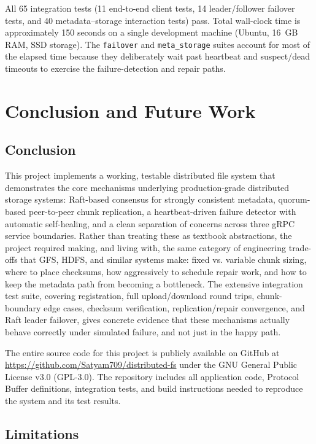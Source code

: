 \documentclass[12pt,a4paper]{report}
\begin{document}
All 65 integration tests (11 end-to-end client tests, 14 leader/follower failover tests, and 40 metadata--storage interaction tests) pass. Total wall-clock time is approximately 150 seconds on a single development machine (Ubuntu, 16~GB RAM, SSD storage). The \texttt{failover} and \texttt{meta\_storage} suites account for most of the elapsed time because they deliberately wait past heartbeat and suspect/dead timeouts to exercise the failure-detection and repair paths.

\chapter{Conclusion and Future Work}

\section{Conclusion}

This project implements a working, testable distributed file system that demonstrates the core mechanisms underlying production-grade distributed storage systems: Raft-based consensus for strongly consistent metadata, quorum-based peer-to-peer chunk replication, a heartbeat-driven failure detector with automatic self-healing, and a clean separation of concerns across three gRPC service boundaries. Rather than treating these as textbook abstractions, the project required making, and living with, the same category of engineering trade-offs that GFS, HDFS, and similar systems make: fixed vs. variable chunk sizing, where to place checksums, how aggressively to schedule repair work, and how to keep the metadata path from becoming a bottleneck. The extensive integration test suite, covering registration, full upload/download round trips, chunk-boundary edge cases, checksum verification, replication/repair convergence, and Raft leader failover, gives concrete evidence that these mechanisms actually behave correctly under simulated failure, and not just in the happy path.

The entire source code for this project is publicly available on GitHub at \url{https://github.com/Satyam709/distributed-fs} under the GNU General Public License v3.0 (GPL-3.0). The repository includes all application code, Protocol Buffer definitions, integration tests, and build instructions needed to reproduce the system and its test results.

\section{Limitations}
\label{sec:limitations}
\end{document}
